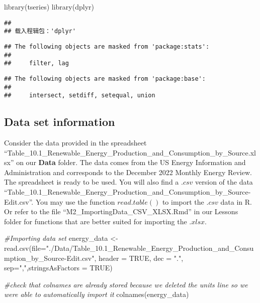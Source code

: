 \documentclass[
]{article}
\newenvironment{Shaded}{\begin{snugshade}}{\end{snugshade}}
\newcommand{\AttributeTok}[1]{\textcolor[rgb]{0.77,0.63,0.00}{#1}}
\newcommand{\CommentTok}[1]{\textcolor[rgb]{0.56,0.35,0.01}{\textit{#1}}}
\newcommand{\ConstantTok}[1]{\textcolor[rgb]{0.00,0.00,0.00}{#1}}
\newcommand{\FunctionTok}[1]{\textcolor[rgb]{0.00,0.00,0.00}{#1}}
\newcommand{\NormalTok}[1]{#1}
\newcommand{\OtherTok}[1]{\textcolor[rgb]{0.56,0.35,0.01}{#1}}
\newcommand{\StringTok}[1]{\textcolor[rgb]{0.31,0.60,0.02}{#1}}
\begin{document}
\begin{Shaded}
\begin{Highlighting}[]
\FunctionTok{library}\NormalTok{(tseries)}
\FunctionTok{library}\NormalTok{(dplyr)}
\end{Highlighting}
\end{Shaded}

\begin{verbatim}
## 
## 载入程辑包：'dplyr'
\end{verbatim}

\begin{verbatim}
## The following objects are masked from 'package:stats':
## 
##     filter, lag
\end{verbatim}

\begin{verbatim}
## The following objects are masked from 'package:base':
## 
##     intersect, setdiff, setequal, union
\end{verbatim}

\hypertarget{data-set-information}{%
\subsection{Data set information}\label{data-set-information}}

Consider the data provided in the spreadsheet
``Table\_10.1\_Renewable\_Energy\_Production\_and\_Consumption\_by\_Source.xlsx''
on our \textbf{Data} folder. The data comes from the US Energy
Information and Administration and corresponds to the December 2022
Monthly Energy Review. The spreadsheet is ready to be used. You will
also find a \(.csv\) version of the data
``Table\_10.1\_Renewable\_Energy\_Production\_and\_Consumption\_by\_Source-Edit.csv''.
You may use the function \(read.table()\) to import the \(.csv\) data in
R. Or refer to the file ``M2\_ImportingData\_CSV\_XLSX.Rmd'' in our
Lessons folder for functions that are better suited for importing the
\(.xlsx\).

\begin{Shaded}
\begin{Highlighting}[]
\CommentTok{\#Importing data set}
\NormalTok{energy\_data }\OtherTok{\textless{}{-}} \FunctionTok{read.csv}\NormalTok{(}\AttributeTok{file=}\StringTok{"./Data/Table\_10.1\_Renewable\_Energy\_Production\_and\_Consumption\_by\_Source{-}Edit.csv"}\NormalTok{, }\AttributeTok{header =} \ConstantTok{TRUE}\NormalTok{, }\AttributeTok{dec =} \StringTok{"."}\NormalTok{, }\AttributeTok{sep=}\StringTok{","}\NormalTok{,}\AttributeTok{stringsAsFactors =} \ConstantTok{TRUE}\NormalTok{) }

\CommentTok{\#check that colnames are already stored because we deleted the units line so we were able to automatically import it}
\FunctionTok{colnames}\NormalTok{(energy\_data)}
\end{Highlighting}
\end{Shaded}
\end{document}
